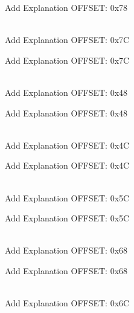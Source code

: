 \begin{DoxyRefList}
\label{todo__todo000121}%
%
Add Explanation OFFSET\+: 0x78  
\item[{\parbox[t]{\linewidth}{Member \doxylink{struct_r_c_c___reg_def__t_acdd86f2b3c487d0a3e627037f18c5720}{RCC\+\_\+\+Reg\+Def\+\_\+t\+::reserve11} }}]\hfill \\
\label{todo__todo000052}%
%
Add Explanation OFFSET\+: 0x7C 

\label{todo__todo000122}%
%
Add Explanation OFFSET\+: 0x7C  
\item[{\parbox[t]{\linewidth}{Member \doxylink{struct_r_c_c___reg_def__t_a568e1d49f141d8910c25daa3b5d749bc}{RCC\+\_\+\+Reg\+Def\+\_\+t\+::reserve5} }}]\hfill \\
\label{todo__todo000039}%
%
Add Explanation OFFSET\+: 0x48 

\label{todo__todo000109}%
%
Add Explanation OFFSET\+: 0x48  
\item[{\parbox[t]{\linewidth}{Member \doxylink{struct_r_c_c___reg_def__t_a41121bee070a806af86286949a694e5c}{RCC\+\_\+\+Reg\+Def\+\_\+t\+::reserve6} }}]\hfill \\
\label{todo__todo000040}%
%
Add Explanation OFFSET\+: 0x4C 

\label{todo__todo000110}%
%
Add Explanation OFFSET\+: 0x4C  
\item[{\parbox[t]{\linewidth}{Member \doxylink{struct_r_c_c___reg_def__t_ac4a38195e203c38e06acd10f43e8f0ef}{RCC\+\_\+\+Reg\+Def\+\_\+t\+::reserve7} }}]\hfill \\
\label{todo__todo000044}%
%
Add Explanation OFFSET\+: 0x5C 

\label{todo__todo000114}%
%
Add Explanation OFFSET\+: 0x5C  
\item[{\parbox[t]{\linewidth}{Member \doxylink{struct_r_c_c___reg_def__t_a980a854283abdcd1d275c888a4b57ddd}{RCC\+\_\+\+Reg\+Def\+\_\+t\+::reserve8} }}]\hfill \\
\label{todo__todo000047}%
%
Add Explanation OFFSET\+: 0x68 

\label{todo__todo000117}%
%
Add Explanation OFFSET\+: 0x68  
\item[{\parbox[t]{\linewidth}{Member \doxylink{struct_r_c_c___reg_def__t_adbedb829db07cb1bbc378a56a4e23ebc}{RCC\+\_\+\+Reg\+Def\+\_\+t\+::reserve9} }}]\hfill \\
\label{todo__todo000048}%
%
Add Explanation OFFSET\+: 0x6C 


\end{DoxyRefList}
